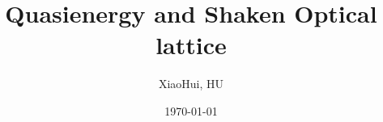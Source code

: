 \documentclass[
 reprint,
amsmath,amssymb,
aps,
pra,
floatfix,
]{revtex4-2}
\begin{document}

\title{Quasienergy and Shaken Optical lattice}%

\author{XiaoHui, HU}




\date{\today}%


\maketitle
\end{document}
